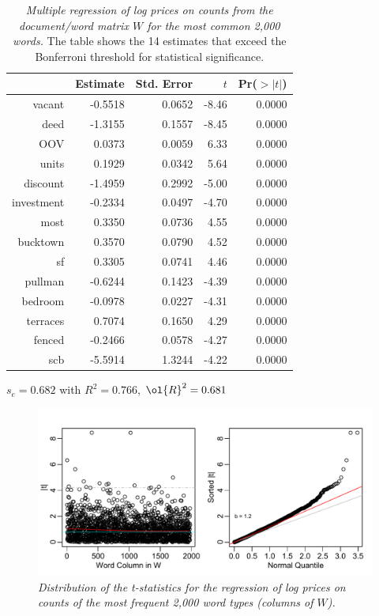 \documentclass[10pt]{article}
\begin{document}
 \begin{table}
 \caption{ \label{tab:regrInd} {\sl Multiple regression of log prices on 
  counts from the document/word matrix $W$ for the most common 2,000 words.}  The table shows the 14 estimates that exceed the Bonferroni threshold for statistical significance.} 

\begin{center}
\begin{tabular}{rrrrr}
  \hline
 & Estimate & Std. Error & $t$ & Pr($>|t|$) \\ 
  \hline
  vacant & -0.5518 & 0.0652 & -8.46 & 0.0000 \\ 
  deed & -1.3155 & 0.1557 & -8.45 & 0.0000 \\ 
  OOV & 0.0373 & 0.0059 & 6.33 & 0.0000 \\ 
  units & 0.1929 & 0.0342 & 5.64 & 0.0000 \\ 
  discount & -1.4959 & 0.2992 & -5.00 & 0.0000 \\ 
  investment & -0.2334 & 0.0497 & -4.70 & 0.0000 \\ 
  most & 0.3350 & 0.0736 & 4.55 & 0.0000 \\ 
  bucktown & 0.3570 & 0.0790 & 4.52 & 0.0000 \\ 
  sf & 0.3305 & 0.0741 & 4.46 & 0.0000 \\ 
  pullman & -0.6244 & 0.1423 & -4.39 & 0.0000 \\ 
  bedroom & -0.0978 & 0.0227 & -4.31 & 0.0000 \\ 
  terraces & 0.7074 & 0.1650 & 4.29 & 0.0000 \\ 
  fenced & -0.2466 & 0.0578 & -4.27 & 0.0000 \\ 
  scb & -5.5914 & 1.3244 & -4.22 & 0.0000 \\ 
 \hline
\end{tabular}
 
    $s_e =  0.682$ with $R^2 =  0.766$, $\ol{R}^2 =  0.681$  
\end{center}
\end{table}



 \begin{figure}
  \caption{ \label{fig:regrInd} { \sl Distribution of the t-statistics for the regression of log prices on counts of the most frequent 2,000 word types (columns of $W$).}}
 \centerline{  \includegraphics[width=6in]{figures/tstatRegrInd}    }
 \vspace{0.2in}
 \end{figure}
\end{document}
